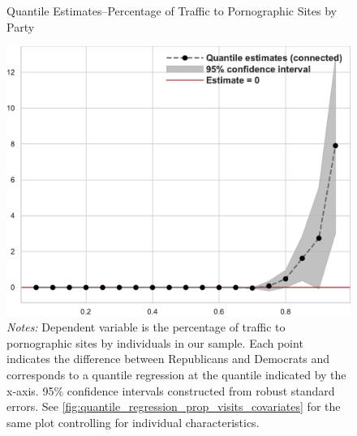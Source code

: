 \documentclass[12pt, letterpaper]{article}
\begin{document}
\begin{figure}
	\centering
	\caption{Quantile Estimates--Percentage of Traffic to Pornographic Sites by Party}
	\includegraphics[width=.6\linewidth]{../figs/quantile_reg_proportion_visits_adult.pdf}
	\caption*{\footnotesize \emph{Notes:} 
		Dependent variable is the percentage of traffic to pornographic sites by individuals in our sample.
		Each point indicates the difference between Republicans and Democrats and corresponds to a quantile regression at the quantile indicated by the x-axis.
		95\% confidence intervals constructed from robust standard errors.
		See \cref{fig:quantile_regression_prop_visits_covariates} for the same plot controlling for individual characteristics.
	}
	\label{fig:quantile_regression_prop_visits}
\end{figure}
\end{document}
